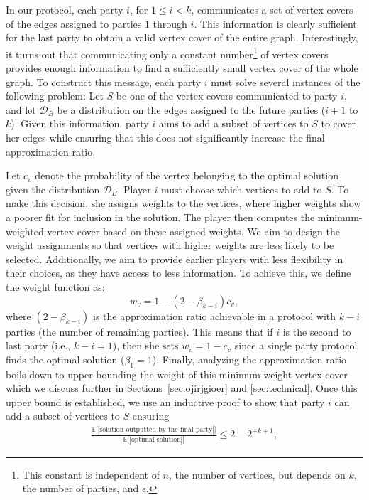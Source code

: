 \documentclass[11pt]{article}
\newcommand{\E}[0]{\ensuremath{\mathbb{E}}}
\begin{document}
In our protocol, each party \(i\), for \(1 \leq i < k\), communicates a set of vertex covers of the edges assigned to parties \(1\) through \(i\). This information is clearly sufficient for the last party to obtain a valid vertex cover of the entire graph. Interestingly, it turns out that communicating only a constant number\footnote{This constant is independent of $n$, the number of vertices, but depends on $k$, the number of parties, and $\epsilon$.} of vertex covers provides enough information to find a sufficiently small vertex cover of the whole graph. To construct this message, each party \(i\) must solve several instances of the following problem: Let \(S\) be one of the vertex covers communicated to party \(i\), and let  \(\mathcal{D}_B\) be a distribution on the edges assigned to the future parties (\(i+1\) to \(k\)). Given this information, party \(i\) aims to add a subset of vertices to \(S\) to cover her edges while ensuring that this does not significantly increase the final approximation ratio.

Let $c_v$ denote the probability of the vertex belonging to the optimal solution given the distribution \(\mathcal{D}_B\). Player $i$ must choose which vertices to add to $S$. To make this decision, she assigns weights to the vertices, where higher weights show a poorer fit for inclusion in the solution. The player then computes the minimum-weighted vertex cover based on these assigned weights.
We aim to design the weight assignments so that vertices with higher weights are less likely to be selected. Additionally, we aim to provide earlier players with less flexibility in their choices, as they have access to less information. To achieve this, we define the weight function as:
\begin{equation}
    w_v= 1- (2-\beta_{k-i})c_v,
\end{equation}
where $(2-\beta_{k-i})$ is the approximation ratio achievable in a protocol with $k-i$ parties (the number of remaining parties). This means that if  $i$ is the second to last party (i.e., $k-i=1$), then she sets $w_v=1-c_v$ since a single party protocol finds the optimal solution ($\beta_{1} = 1$). Finally, analyzing the approximation ratio boils down to upper-bounding the weight of this minimum weight vertex cover which we discuss further in Sections~\ref{sec:ojirjgioer} and \ref{sec:technical}. Once this upper bound is established, we use an inductive proof to show that party \(i\) can add a subset of vertices to \(S\) ensuring
\begin{align}
    \frac{\E\big[|\text{solution outputted by the final party}|\big]}{\E\big[|\text{optimal solution}|\big]} \leq 2 - 2^{-k+1},
\end{align}
    
\end{document}

